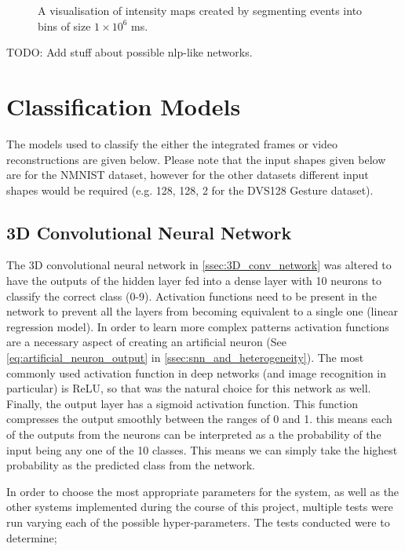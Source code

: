 \begin{figure}[htb]
    \caption{A visualisation of intensity maps created by segmenting events into bins of size $ 1 \times 10^6 $ ms.}%
    \label{fig:nmnist_spikes_to_intensity_map}%
\end{figure}

\color{red} TODO: Add stuff about possible nlp-like networks. \color{black}

\section{Classification Models}

The models used to classify the either the integrated frames or video reconstructions are given below. Please note that the input shapes given below are for the NMNIST dataset, however for the other datasets different input shapes would be required (e.g. {128, 128, 2} for the DVS128 Gesture dataset).

\subsection{3D Convolutional Neural Network}

The 3D convolutional neural network in \cref{ssec:3D_conv_network} was altered to have the outputs of the hidden layer fed into a dense layer with 10 neurons to classify the correct class (0-9). Activation functions need to be present in the network to prevent all the layers from becoming equivalent to a single one (linear regression model). In order to learn more complex patterns activation functions are a necessary aspect of creating an artificial neuron (See \cref{eq:artificial_neuron_output} in \cref{ssec:snn_and_heterogeneity}). The most commonly used activation function in deep networks (and image recognition in particular) is ReLU, so that was the natural choice for this network as well. Finally, the output layer has a sigmoid activation function. This function compresses the output smoothly between the ranges of 0 and 1. this means each of the outputs from the neurons can be interpreted as a the probability of the input being any one of the 10 classes. This means we can simply take the highest probability as the predicted class from the network.

In order to choose the most appropriate parameters for the system, as well as the other systems implemented during the course of this project, multiple tests were run varying each of the possible hyper-parameters. The tests conducted were to determine;

